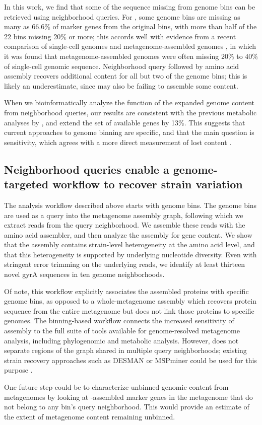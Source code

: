 In this work, we find that some of the sequence missing from genome
bins can be retrieved using neighborhood queries.  For \hu, some
genome bins are missing as many as 66.6\% of marker genes from the
original bins, with more than half of the 22 bins missing 20\% or
more; this accords well with evidence from a recent comparison of
single-cell genomes and metagenome-assembled genomes \cite{baltic}, in
which it was found that metagenome-assembled genomes were often
missing 20\% to 40\% of single-cell genomic sequence.  Neighborhood
query followed by amino acid assembly recovers additional content for
all but two of the genome bins; this is likely an underestimate, since
\plass may also be failing to assemble some content.

When we bioinformatically analyze the
function of the expanded genome content from neighborhood queries, our
results are consistent with the previous metabolic analyses by \cite{Hu2016}, and extend the
set of available genes by 13\%.
This suggests that current approaches to genome binning are specific,
and that the main question is sensitivity, which agrees with a more direct
measurement of lost content \cite{baltic}.

\subsection*{Neighborhood queries enable a genome-targeted workflow to recover strain variation}

The \sgc analysis workflow described above starts with genome bins. The
genome bins are used as a query into the metagenome assembly graph,
following which we extract reads from the query neighborhood.  We
assemble these reads with the \plass amino acid assembler, and then
analyze the assembly for gene content. We show that the \plass
assembly contains strain-level heterogeneity at the amino acid level,
and that this heterogeneity is supported by underlying nucleotide
diversity.  Even with stringent error trimming on the underlying
reads, we identify at least thirteen novel gyrA sequences in ten
genome neighborhoods.

Of note, this workflow explicitly associates the \plass assembled
proteins with specific genome bins, as opposed to a whole-metagenome
\plass assembly which recovers protein sequence from the entire
metagenome but does not link those proteins to specific genomes. The
binning-based workflow connects the increased sensitivity of \plass
assembly to the full suite of tools available for genome-resolved
metagenome analysis, including phylogenomic and metabolic
analysis. However, \sgc does not separate regions of the graph shared
in multiple query neighborhoods; existing
strain recovery approaches such as DESMAN or MSPminer could be used for this purpose
\cite{desman,mspminer}.

One future step could be to characterize unbinned genomic
content from metagenomes by looking at \plass-assembled marker genes
in the metagenome that do not belong to any bin's query neighborhood.
This would provide an estimate of the extent of
metagenome content remaining unbinned.
